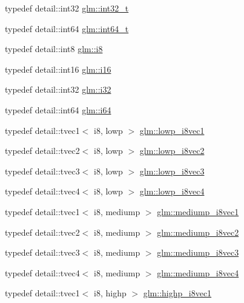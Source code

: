 \begin{DoxyCompactItemize}
\item 
typedef detail\+::int32 \hyperlink{group__gtc__type__precision_gab870c0eb6f525b0c8c4716762e0fc3a8}{glm\+::int32\+\_\+t}
\item 
typedef detail\+::int64 \hyperlink{group__gtc__type__precision_ga6abb23fbf4e39c50ec5341160b5da5ab}{glm\+::int64\+\_\+t}
\item 
typedef detail\+::int8 \hyperlink{group__gtc__type__precision_gaae064be68b7d36cd7910c16e8ad18bba}{glm\+::i8}
\item 
typedef detail\+::int16 \hyperlink{group__gtc__type__precision_ga35e5542ca05b29cc256fdafb8503d1fd}{glm\+::i16}
\item 
typedef detail\+::int32 \hyperlink{group__gtc__type__precision_ga1d8ed5c43e91ea7d4528389da4fa9524}{glm\+::i32}
\item 
typedef detail\+::int64 \hyperlink{group__gtc__type__precision_gac7a7eaad46064fc952b06df33689da23}{glm\+::i64}
\item 
typedef detail\+::tvec1$<$ i8, lowp $>$ \hyperlink{group__gtc__type__precision_ga490ff77964d0386c1db936eb2a324988}{glm\+::lowp\+\_\+i8vec1}
\item 
typedef detail\+::tvec2$<$ i8, lowp $>$ \hyperlink{group__gtc__type__precision_ga511280c8869c7c79bba3c359f37f5559}{glm\+::lowp\+\_\+i8vec2}
\item 
typedef detail\+::tvec3$<$ i8, lowp $>$ \hyperlink{group__gtc__type__precision_ga048811f03c327d4b56564a72d98800e8}{glm\+::lowp\+\_\+i8vec3}
\item 
typedef detail\+::tvec4$<$ i8, lowp $>$ \hyperlink{group__gtc__type__precision_ga095202095a1fefbdae4a974c3b750223}{glm\+::lowp\+\_\+i8vec4}
\item 
typedef detail\+::tvec1$<$ i8, mediump $>$ \hyperlink{group__gtc__type__precision_ga820f8b497e06d518968d00761747c547}{glm\+::mediump\+\_\+i8vec1}
\item 
typedef detail\+::tvec2$<$ i8, mediump $>$ \hyperlink{group__gtc__type__precision_ga38eba1ab306fe5cc5eeafa35ce5b5b26}{glm\+::mediump\+\_\+i8vec2}
\item 
typedef detail\+::tvec3$<$ i8, mediump $>$ \hyperlink{group__gtc__type__precision_ga91b40a693c1db26a7cc544339b326df3}{glm\+::mediump\+\_\+i8vec3}
\item 
typedef detail\+::tvec4$<$ i8, mediump $>$ \hyperlink{group__gtc__type__precision_gad41bf4bfa504dc1191623ff77151d01f}{glm\+::mediump\+\_\+i8vec4}
\item 
typedef detail\+::tvec1$<$ i8, highp $>$ \hyperlink{group__gtc__type__precision_ga0334353753f93388bcc89f91c9aff476}{glm\+::highp\+\_\+i8vec1}

\end{DoxyCompactItemize}
